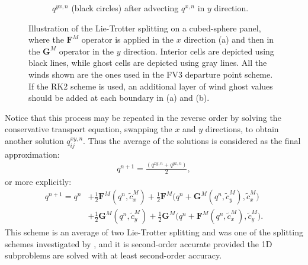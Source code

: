 \documentclass[preprint,12pt]{elsarticle}
\begin{document}
\begin{linenumbers}
\begin{figure}[!htb]
\begin{subfigure}{0.3\textwidth}
		\caption{$q^{yx,n}$ (black circles) after advecting $q^{x,n}$ in $y$ direction. \label{lt-GFQx}}
	\end{subfigure}
	\caption{Illustration of the Lie-Trotter splitting on a cubed-sphere panel, where the $\mathbf{F}^M$ operator is applied in the $x$ direction (a)
	and then in the $\mathbf{G}^M$ operator in the $y$ direction.
	Interior cells are depicted using black lines,
	while ghost cells are depicted using gray lines. 
	All the winds shown are the ones used in the FV3 departure point scheme.
	If the RK2 scheme is used, an additional layer of wind ghost values should be added at each boundary in (a) and (b). \label{ltxdir}}
\end{figure}

Notice that this process may be repeated in the reverse order by solving the conservative transport equation, swapping the $x$ and $y$ directions, to obtain another solution ${q}^{xy,n}_{ij}$.
Thus the average of the solutions is considered as the final approximation:
\begin{align}
	\label{lt-scheme0}
	{q}^{n+1} = \frac{({q}^{xy,n} + {q}^{yx,n})}{2},
\end{align}
or more explicitly:
\begin{align}
	\label{lt-scheme}
	{q}^{n+1} 
	= {q}^n &+ \frac{1}{2}\mathbf{F}^M({q}^n,\tilde{c}^{M}_x) +
	\frac{1}{2}\mathbf{F}^M\bigg({q}^n + \mathbf{G}^M({q}^n, \tilde{c}^{M}_y),\tilde{c}^{M}_x\bigg)\nonumber \\
	&+\frac{1}{2}\mathbf{G}^M({q}^n,\tilde{c}^{M}_y) + 
	\frac{1}{2}\mathbf{G}^M\bigg({q}^n + \mathbf{F}^M({q}^n, \tilde{c}^{M}_x), \tilde{c}^{M}_y\bigg).
\end{align}
This scheme is an average of two Lie-Trotter splitting
and was one of the splitting schemes investigated by \cite{strang:1968}, and it is second-order accurate provided the 1D subproblems are solved with at least second-order accuracy.


\end{linenumbers}
\end{document}
